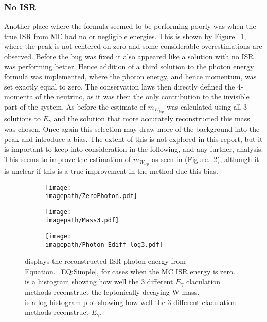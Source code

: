 \subsubsection{No ISR}
\label{SUBSUBSEC:NoISR}
Another place where the formula seemed to be performing poorly was when the true ISR from MC had no or negligible energies. This is shown by Figure.~\ref{SUBFIG:ZeroPhoton}, where the peak is not centered on zero and some considerable overestimations are observed. Before the bug was fixed it also appeared like a solution with no ISR was performing better. Hence addition of a third solution to the photon energy formula was implemented, where the photon energy, and hence momentum, was set exactly equal to zero. The conservation laws then directly defined the 4-momenta of the neutrino, as it was then the only contribution to the invisible part of the system. As before the estimate of ${m}_{W_{lep}}$ was calculated using all 3 solutions to $E_{\gamma}$ and the solution that more accurately reconstructed this mass was chosen. Once again this selection may draw more of the background into the peak and introduce a bias. The extent of this is not explored in this report, but it is important to keep into consideration in the following, and any further, analysis. This seems to improve the estimation of ${m}_{W_{lep}}$ as seen in (Figure.~\ref{SUBFIG:Mass3}), although it is unclear if this is a true improvement in the method due this bias.
\begin{figure}
    \begin{subfigure}[t]{0.32\textwidth}
      \centering
      \texttt{[image: \\imagepath/ZeroPhoton.pdf]}
      \caption{}
      \label{SUBFIG:ZeroPhoton}
    \end{subfigure}
    \begin{subfigure}[t]{0.32\textwidth}
      \centering
      \texttt{[image: \\imagepath/Mass3.pdf]}
      \caption{}
      \label{SUBFIG:Mass3}
    \end{subfigure}
    \begin{subfigure}[t]{0.32\textwidth}
      \centering
      \texttt{[image: \\imagepath/Photon\_Ediff\_log3.pdf]}
      \caption{}
      \label{SUBFIG:Ediff}
    \end{subfigure}
    \caption{
     displays the reconstructed ISR photon energy from Equation.~\ref{EQ:Simple}, for cases when the MC ISR energy is zero.\\
     is a histogram showing how well the 3 different ${E}_{\gamma}$ claculation methods reconstruct the leptonically decaying W mass.\\
     is a log histogram plot showing how well the 3 different claculation methods reconstruct ${E}_{\gamma}$.
     }
    \label{FIG:ZeroPhoton}
\end{figure}
